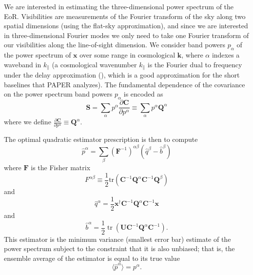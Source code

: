 \documentclass[preprint2,numberedappendix,tighten]{aastex6}  %
\newcommand{\C}{\mathbf{C}}
\newcommand{\F}{\mathbf{F}}
\newcommand{\invC}{\ensuremath{\C^{-1}}}
\DeclareMathOperator{\Tr}{tr}
\newcommand{\half}{\ensuremath{\frac{1}{2}}}
\begin{document}
We are interested in estimating the three-dimensional power spectrum of the EoR.  
Visibilities are measurements of the Fourier transform of the sky along two spatial dimensions (using the flat-sky approximation), and since we are interested in three-dimensional Fourier modes we only need to take one Fourier transform of our visibilities along the line-of-sight dimension.  We consider band powers $p_\alpha$ of the power spectrum of $\textbf{x}$ over some range in cosmological $\mathbf{k}$, where $\alpha$ indexes a waveband in $k_{\parallel}$ (a cosmological wavenumber $k_{\parallel}$ is the Fourier dual to frequency under the delay approximation (\citealt{parsons_et_al2012b}), which is a good approximation for the short baselines that PAPER analyzes).  The fundamental dependence of the covariance on the power spectrum band powers $p_\alpha$ is encoded as 
\begin{equation}
\textbf{S} = \sum_\alpha p^\alpha \frac{\partial\textbf{C}}{\partial p^\alpha} \equiv \sum_\alpha p^\alpha \textbf{Q}^\alpha
\end{equation}
where we define $\frac{\partial\textbf{C}}{\partial p^\alpha} \equiv \textbf{Q}^{\alpha}$.

The optimal quadratic estimator prescription is then to compute
\begin{equation}
\label{eq:OQE}
\widehat{p}^{\alpha}  = \sum_\beta ({\F^{-1}})^{\alpha\beta} (\widehat{q}^{\beta} - \widehat{b}^{\beta} )
\end{equation}
where $\F$ is the Fisher matrix 
\begin{equation}
F^{\alpha \beta} \equiv \frac{1}{2} \textrm{tr} \left( \C^{-1} \textbf{Q}^{\alpha} \C^{-1} \textbf{Q}^{\beta} \right)
\end{equation}
and
\begin{equation}
\label{eq:OQEQuadratic}
\widehat{q}^\alpha =  \half \textbf{x}^\dagger \invC \textbf{Q}^{\alpha}  \invC \textbf{x} 
\end{equation}
and
\begin{equation}
\label{eq:OQELinear}
\widehat{b}^{\alpha} = \half \Tr\left( \mathbf{U} \invC \textbf{Q}^{\alpha} \invC \right).
\end{equation}
This estimator is the minimum variance (smallest error bar) estimate of the power spectrum  subject to the constraint that it is also unbiased; that is, the ensemble average of the estimator is equal to its true value
\begin{equation}
\label{eq:super_unbiased}
\langle \widehat{p}^{\alpha} \rangle = p^\alpha.
\end{equation}
\citep{tegmark_et_al1997a,bond_et_al1998}
\end{document}
